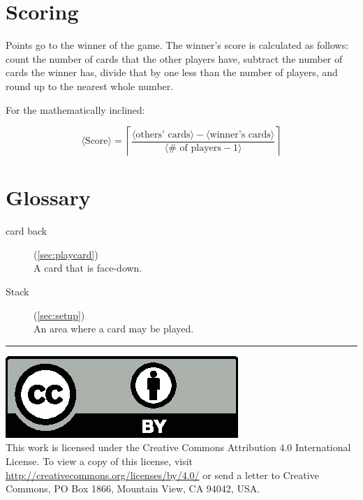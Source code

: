 \documentclass{article}
\begin{document}
\section{Scoring}

Points go to the winner of the game. The winner's score is calculated as follows: count the number of cards that the other players have, subtract the number of cards the winner has, divide that by one less than the number of players, and round up to the nearest whole number.

For the mathematically inclined:

$$
\langle\textrm{Score}\rangle = \left\lceil\frac{\langle\textrm{others'\ cards}\rangle - \langle\textrm{winner's\ cards}\rangle}{\langle\textrm{\#\ of\ players} - 1\rangle}\right\rceil
$$

\section{Glossary}
\begin{description}
  \item[card back] (\autoref{sec:playcard})\\
    A card that is face-down.
  \item[Stack] (\autoref{sec:setup})\\
    An area where a card may be played.
\end{description}

\medskip
\hrule

{
  \small
  \includegraphics[scale=0.5]{cc-by.eps}\\
  This work is licensed under the Creative Commons Attribution 4.0
  International License. To view a copy of this license, visit
  \url{http://creativecommons.org/licenses/by/4.0/} or send a letter to Creative Commons, PO Box 1866, Mountain View, CA 94042, USA.
}
\end{document}
